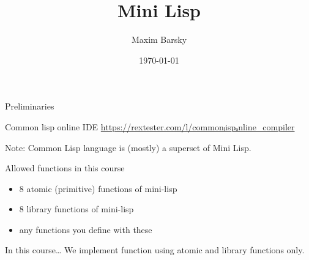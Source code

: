\documentclass[fleqn]{beamer}
\title{Mini Lisp}
\author{Maxim Barsky}
\institute[Programming Languages- 236319]{Programming Languages⏎ 236319}
\date{\today}
\begin{document}
\setLTR
\begin{frame}
\titlepage
\end{frame}

\begin{frame}{Preliminaries}
\begin{block}{Common lisp online IDE}
  \url{https://rextester.com/l/commonₗispₒnline_compiler}
\end{block}
Note: Common Lisp language is (mostly)  a superset of Mini Lisp.
\begin{block}{Allowed functions in this course}
  \begin{itemize}
    \item 8 atomic (primitive) functions of mini-lisp
    \item 8 library functions of mini-lisp
    \item any functions you define with these
  \end{itemize}
\end{block}
\begin{block}{In this course…}
  We implement function  using atomic and library functions only.
\end{block}
\end{frame}
\end{document}
